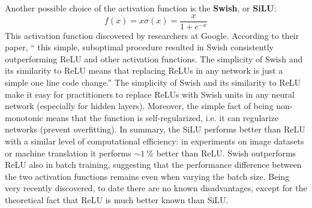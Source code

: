 Another possible choice of the activation function is the \textbf{Swish}, or \textbf{SiLU}:
\begin{equation}
f(x)=x\sigma(x)=\frac{x}{1+e^{-x}}
\end{equation}
This activation function discovered by researchers at Google. According to their paper, ``\textelp{} this simple, suboptimal procedure resulted in Swish consistently outperforming ReLU and other activation functions. \textelp{} The simplicity of Swish and its similarity to ReLU means that replacing ReLUs in any network is just a simple one line code change.'' The simplicity of Swish and its similarity to ReLU make it easy for practitioners to replace ReLUs with Swish units in any neural network (especially for hidden layers). Moreover, the simple fact of being non-monotonic means that the function is self-regularized, i.e. it can regularize networks (prevent overfitting). In summary, the SiLU performs better than ReLU with a similar level of computational efficiency: in experiments on image datasets or machine translation it performs $\sim\SI{1}{\percent}$ better than ReLU. Swish outperforms ReLU also in batch training, suggesting that the performance difference between the two activation functions remains even when varying the batch size. Being very recently discovered, to date there are no known disadvantages, except for the theoretical fact that ReLU is much better known than SiLU.

